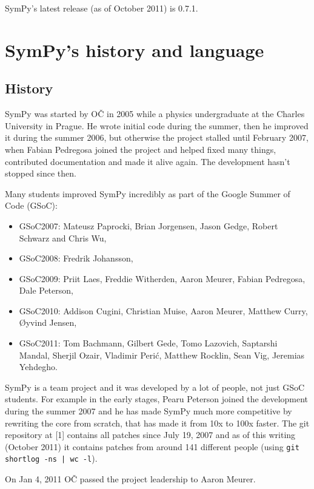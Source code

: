 \documentclass[12pt]{article}
\def\OC{OČ}
\begin{document}
SymPy's latest release (as of October 2011) is 0.7.1.

\section{SymPy's history and language}

\subsection{History}

SymPy was started by \OC{} in 2005 while a
physics undergraduate at the Charles University in Prague.
He wrote initial code during the
summer, then he improved it during the summer 2006, but otherwise the project
stalled until February 2007, when
Fabian Pedregosa joined the project and helped fixed many things, contributed
documentation and made it alive again. The development hasn't stopped since
then.

Many students improved SymPy incredibly 
as part of the Google Summer of Code (GSoC):
\begin{itemize}
\item
GSoC2007: Mateusz Paprocki, Brian
Jorgensen, Jason Gedge, Robert Schwarz and Chris Wu,
\item
GSoC2008: Fredrik Johansson,

\item
GSoC2009: Priit Laes, Freddie Witherden, Aaron Meurer,
Fabian Pedregosa, Dale Peterson,

\item
GSoC2010:
Addison Cugini, Christian Muise, Aaron Meurer, Matthew Curry,
{\O}yvind Jensen,

\item
GSoC2011: Tom Bachmann, Gilbert Gede, Tomo Lazovich, Saptarshi Mandal, 
Sherjil Ozair, Vladimir Peri\'c,  Matthew Rocklin, Sean Vig, Jeremias Yehdegho.
\end{itemize}

\noindent
SymPy is a team project and it was developed by a lot of people, not
just GSoC students. For example in the early stages, Pearu Peterson
joined the development during the summer 2007 and he has made SymPy much more
competitive by rewriting the core from scratch, that has made it from 10x to
100x faster. The git repository at [1] contains all patches since July 19, 2007
and as of this writing (October 2011) it contains patches from around 141
different people (using {\tt git shortlog -ns | wc -l}).

On Jan 4, 2011 \OC{} passed the project leadership to Aaron Meurer.
\end{document}
